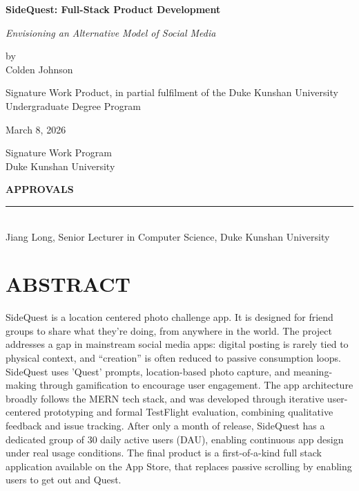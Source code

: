 \documentclass[12pt]{article}
\begin{document}
\begin{titlepage}
  \centering
  \vspace*{0cm}

  {\Large \textbf{SideQuest: Full-Stack Product Development}\par}
  {\large \textit{Envisioning an Alternative Model of Social Media}\par}
  
  \vspace*{0.5cm}

  by\\
  Colden Johnson

  \vspace{1.5cm}

  Signature Work Product, in partial fulfilment of the Duke Kunshan University Undergraduate Degree Program

  \vspace{2.5cm}

  March 8, 2026

  \vspace{2.5cm}

  Signature Work Program\\ 
  Duke Kunshan University



  \vfill
  \begin{flushleft}
  \textbf{APPROVALS}\\
  \rule{10cm}{0.4pt}\\
  Jiang Long, Senior Lecturer in Computer Science, Duke Kunshan University
  \end{flushleft}

\end{titlepage}

\section{ABSTRACT}
SideQuest is a location centered photo challenge app. It is designed for friend groups to share what they're doing, from anywhere in the world. The project addresses a gap in mainstream social media apps: digital posting is rarely tied to physical context, and ``creation'' is often reduced to passive consumption loops. SideQuest uses 'Quest' prompts, location-based photo capture, and meaning-making through gamification to encourage user engagement. The app architecture broadly follows the MERN tech stack, and was developed through iterative user-centered prototyping and formal TestFlight evaluation, combining qualitative feedback and issue tracking. After only a month of release, SideQuest has a dedicated group of 30 daily active users (DAU), enabling continuous app design under real usage conditions. The final product is a first-of-a-kind full stack application available on the App Store, that replaces passive scrolling by enabling users to get out and Quest.
\end{document}

